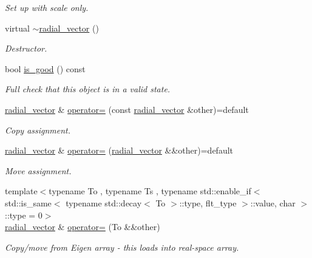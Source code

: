 \begin{DoxyCompactItemize}
\begin{DoxyCompactList}\small\item\em Set up with scale only. \end{DoxyCompactList}\item 
virtual \hyperlink{classIceBRG_1_1Fourier_1_1radial__vector_aa7fe478b701afea873528946b6cbd4da}{$\sim$radial\+\_\+vector} ()
\begin{DoxyCompactList}\small\item\em Destructor. \end{DoxyCompactList}\item 
bool \hyperlink{classIceBRG_1_1Fourier_1_1radial__vector_a7bf23b1ec8a46b7ebaa3b12bc9065dbb}{is\+\_\+good} () const 
\begin{DoxyCompactList}\small\item\em Full check that this object is in a valid state. \end{DoxyCompactList}\item 
\hyperlink{classIceBRG_1_1Fourier_1_1radial__vector}{radial\+\_\+vector} \& \hyperlink{classIceBRG_1_1Fourier_1_1radial__vector_a2ce1419c3156d411c3ed4d3965138542}{operator=} (const \hyperlink{classIceBRG_1_1Fourier_1_1radial__vector}{radial\+\_\+vector} \&other)=default
\begin{DoxyCompactList}\small\item\em Copy assignment. \end{DoxyCompactList}\item 
\hyperlink{classIceBRG_1_1Fourier_1_1radial__vector}{radial\+\_\+vector} \& \hyperlink{classIceBRG_1_1Fourier_1_1radial__vector_a3339dd5e52a7177693085a7222816ee6}{operator=} (\hyperlink{classIceBRG_1_1Fourier_1_1radial__vector}{radial\+\_\+vector} \&\&other)=default
\begin{DoxyCompactList}\small\item\em Move assignment. \end{DoxyCompactList}\item 
{\footnotesize template$<$typename To , typename Ts , typename std\+::enable\+\_\+if$<$ std\+::is\+\_\+same$<$ typename std\+::decay$<$ To $>$\+::type, flt\+\_\+type $>$\+::value, char $>$\+::type  = 0$>$ }\\\hyperlink{classIceBRG_1_1Fourier_1_1radial__vector}{radial\+\_\+vector} \& \hyperlink{classIceBRG_1_1Fourier_1_1radial__vector_a4e3bb931933d1ecb95ec7922a5760f04}{operator=} (To \&\&other)
\begin{DoxyCompactList}\small\item\em Copy/move from Eigen array -\/ this loads into real-\/space array. \end{DoxyCompactList}\item 

\end{DoxyCompactItemize}
